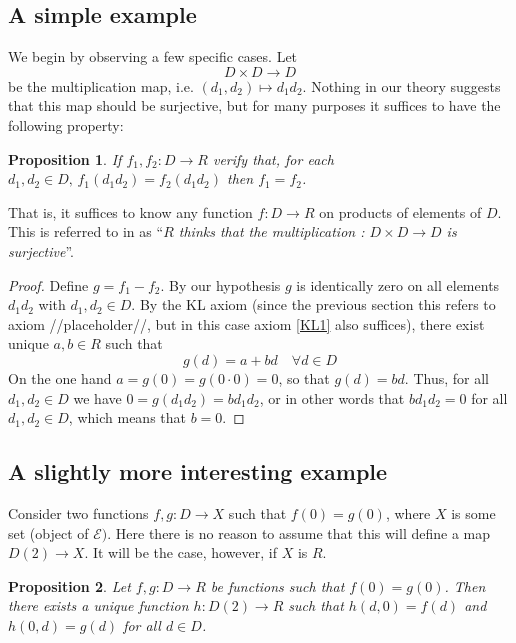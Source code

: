 \documentclass[11pt]{article}
\newtheorem{proposition}{Proposition}[section]
\theoremstyle{definition}
\newcommand{\sdgE}{\mathcal{E}}
\numberwithin{equation}{section}
\begin{document}
\subsection{A simple example}

We begin by observing a few specific cases. Let
\begin{equation*}
   D\times D \to D 
\end{equation*}
be the multiplication map, i.e. \( (d_1,d_2)\mapsto d_1d_2 \). Nothing in our theory suggests that this map should be surjective, but for many purposes it suffices to have the following property:

\begin{proposition}
  If \( f_1,f_2:D \to R \) verify that, for each \( d_1,d_2\in D,\, f_1(d_1d_2) = f_2(d_1d_2)  \) then \( f_1=f_2 \).
\end{proposition}

That is, it suffices to know any function \( f:D\to R \) on products of elements of \( D \). This is referred to in \cite{kock06} as ``\emph{\( R \) thinks that the multiplication : \( D\times D\to D \) is surjective}''.

\begin{proof}
  Define \( g = f_1-f_2 \). By our hypothesis \( g \) is identically zero on all elements \( d_1d_2 \) with \( d_1,d_2\in D \). By the KL axiom (since the previous section this refers to axiom {//placeholder//}, but in this case axiom \ref{KL1} also suffices), there exist unique \( a,b\in R \) such that
  \begin{equation*}
    g(d)=a + bd\quad \forall d\in D 
  \end{equation*}
  On the one hand \( a=g(0)=g(0\cdot 0) = 0 \), so that \( g(d)=bd \). Thus, for all \( d_1,d_2\in D \) we have \( 0 = g(d_1d_2) = bd_1d_2 \), or in other words that \( bd_1d_2=0 \) for all \( d_1,d_2\in D \), which means that \( b=0 \).
\end{proof}

\subsection{A slightly more interesting example}

Consider two functions \( f,g:D\to X \) such that \( f(0)=g(0) \), where \( X \) is some set (object of \(  \sdgE) \). Here there is no reason to assume that this will define a map \( D(2)\to X \). It will be the case, however, if \( X \) is \( R \).

\begin{proposition}
  Let \( f,g:D\to R \) be functions such that \( f(0)=g(0) \). Then there exists a unique function \( h:D(2)\to R \) such that \( h(d,0) = f(d) \) and \( h(0,d)=g(d) \) for all \( d\in D \).
  \label{prop:d2}
\end{proposition}
\end{document}
